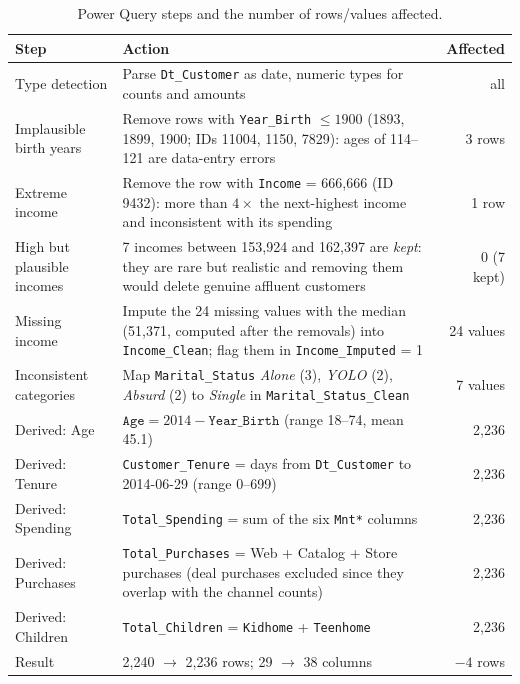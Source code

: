 \documentclass[11pt]{article}
\begin{document}
\begin{table}[H]\centering\small
\caption{Power Query steps and the number of rows/values affected.}\label{tab:pq}
\begin{tabular}{@{}p{3.2cm}p{7.6cm}r@{}}
\toprule
Step & Action & Affected \\
\midrule
Type detection & Parse \texttt{Dt\_Customer} as date, numeric types for counts and amounts & all \\
Implausible birth years & Remove rows with \texttt{Year\_Birth} $\le 1900$ (1893, 1899, 1900; IDs 11004, 1150, 7829): ages of 114--121 are data-entry errors & 3 rows \\
Extreme income & Remove the row with \texttt{Income} = 666{,}666 (ID 9432): more than $4\times$ the next-highest income and inconsistent with its spending & 1 row \\
High but plausible incomes & 7 incomes between 153{,}924 and 162{,}397 are \emph{kept}: they are rare but realistic and removing them would delete genuine affluent customers & 0 (7 kept) \\
Missing income & Impute the 24 missing values with the median (51{,}371, computed after the removals) into \texttt{Income\_Clean}; flag them in \texttt{Income\_Imputed} = 1 & 24 values \\
Inconsistent categories & Map \texttt{Marital\_Status} \emph{Alone} (3), \emph{YOLO} (2), \emph{Absurd} (2) to \emph{Single} in \texttt{Marital\_Status\_Clean} & 7 values \\
Derived: Age & $\texttt{Age} = 2014 - \texttt{Year\_Birth}$ (range 18--74, mean 45.1) & 2{,}236 \\
Derived: Tenure & \texttt{Customer\_Tenure} = days from \texttt{Dt\_Customer} to 2014-06-29 (range 0--699) & 2{,}236 \\
Derived: Spending & \texttt{Total\_Spending} = sum of the six \texttt{Mnt*} columns & 2{,}236 \\
Derived: Purchases & \texttt{Total\_Purchases} = Web + Catalog + Store purchases (deal purchases excluded since they overlap with the channel counts) & 2{,}236 \\
Derived: Children & \texttt{Total\_Children} = \texttt{Kidhome} + \texttt{Teenhome} & 2{,}236 \\
\midrule
Result & 2{,}240 $\rightarrow$ 2{,}236 rows; 29 $\rightarrow$ 38 columns & $-4$ rows \\
\bottomrule
\end{tabular}
\end{table}
\end{document}
